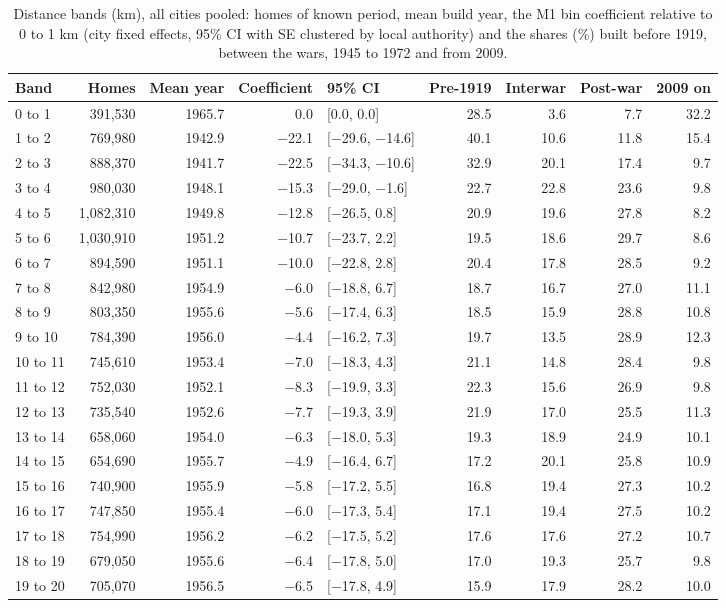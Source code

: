 \documentclass[11pt,a4paper]{article}
\begin{document}
\begin{table}[tbp]\centering\footnotesize\setlength{\tabcolsep}{4pt}\caption{Distance bands (km), all cities pooled: homes of known period, mean build year, the M1 bin coefficient relative to 0 to 1 km (city fixed effects, 95\% CI with SE clustered by local authority) and the shares (\%) built before 1919, between the wars, 1945 to 1972 and from 2009.}\label{tab:bins}\begin{tabular}{lrrrlrrrr}\toprule Band & Homes & Mean year & Coefficient & 95\% CI & Pre-1919 & Interwar & Post-war & 2009 on\\\midrule
0 to 1 & 391,530 & 1965.7 & 0.0 & [0.0, 0.0] & 28.5 & 3.6 & 7.7 & 32.2\\
1 to 2 & 769,980 & 1942.9 & $-$22.1 & [$-$29.6, $-$14.6] & 40.1 & 10.6 & 11.8 & 15.4\\
2 to 3 & 888,370 & 1941.7 & $-$22.5 & [$-$34.3, $-$10.6] & 32.9 & 20.1 & 17.4 & 9.7\\
3 to 4 & 980,030 & 1948.1 & $-$15.3 & [$-$29.0, $-$1.6] & 22.7 & 22.8 & 23.6 & 9.8\\
4 to 5 & 1,082,310 & 1949.8 & $-$12.8 & [$-$26.5, 0.8] & 20.9 & 19.6 & 27.8 & 8.2\\
5 to 6 & 1,030,910 & 1951.2 & $-$10.7 & [$-$23.7, 2.2] & 19.5 & 18.6 & 29.7 & 8.6\\
6 to 7 & 894,590 & 1951.1 & $-$10.0 & [$-$22.8, 2.8] & 20.4 & 17.8 & 28.5 & 9.2\\
7 to 8 & 842,980 & 1954.9 & $-$6.0 & [$-$18.8, 6.7] & 18.7 & 16.7 & 27.0 & 11.1\\
8 to 9 & 803,350 & 1955.6 & $-$5.6 & [$-$17.4, 6.3] & 18.5 & 15.9 & 28.8 & 10.8\\
9 to 10 & 784,390 & 1956.0 & $-$4.4 & [$-$16.2, 7.3] & 19.7 & 13.5 & 28.9 & 12.3\\
10 to 11 & 745,610 & 1953.4 & $-$7.0 & [$-$18.3, 4.3] & 21.1 & 14.8 & 28.4 & 9.8\\
11 to 12 & 752,030 & 1952.1 & $-$8.3 & [$-$19.9, 3.3] & 22.3 & 15.6 & 26.9 & 9.8\\
12 to 13 & 735,540 & 1952.6 & $-$7.7 & [$-$19.3, 3.9] & 21.9 & 17.0 & 25.5 & 11.3\\
13 to 14 & 658,060 & 1954.0 & $-$6.3 & [$-$18.0, 5.3] & 19.3 & 18.9 & 24.9 & 10.1\\
14 to 15 & 654,690 & 1955.7 & $-$4.9 & [$-$16.4, 6.7] & 17.2 & 20.1 & 25.8 & 10.9\\
15 to 16 & 740,900 & 1955.9 & $-$5.8 & [$-$17.2, 5.5] & 16.8 & 19.4 & 27.3 & 10.2\\
16 to 17 & 747,850 & 1955.4 & $-$6.0 & [$-$17.3, 5.4] & 17.1 & 19.4 & 27.5 & 10.2\\
17 to 18 & 754,990 & 1956.2 & $-$6.2 & [$-$17.5, 5.2] & 17.6 & 17.6 & 27.2 & 10.7\\
18 to 19 & 679,050 & 1955.6 & $-$6.4 & [$-$17.8, 5.0] & 17.0 & 19.3 & 25.7 & 9.8\\
19 to 20 & 705,070 & 1956.5 & $-$6.5 & [$-$17.8, 4.9] & 15.9 & 17.9 & 28.2 & 10.0\\
\bottomrule\end{tabular}\end{table}
\end{document}
